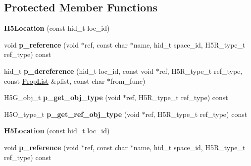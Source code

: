 \subsection*{Protected Member Functions}
\begin{DoxyCompactItemize}
\item 
\mbox{\label{class_h5_1_1_h5_location_a0ca5c720d5b48dfeb15a2aac9fe0949c}} 
{\bfseries H5\+Location} (const hid\+\_\+t loc\+\_\+id)
\item 
\mbox{\label{class_h5_1_1_h5_location_a38b69af1d6e5648568a9568c99e660a3}} 
void {\bfseries p\+\_\+reference} (void $\ast$ref, const char $\ast$name, hid\+\_\+t space\+\_\+id, H5\+R\+\_\+type\+\_\+t ref\+\_\+type) const
\item 
\mbox{\label{class_h5_1_1_h5_location_a36f569b137f8d372afe3e3f75bf24211}} 
hid\+\_\+t {\bfseries p\+\_\+dereference} (hid\+\_\+t loc\+\_\+id, const void $\ast$ref, H5\+R\+\_\+type\+\_\+t ref\+\_\+type, const \hyperlink{class_h5_1_1_prop_list}{Prop\+List} \&plist, const char $\ast$from\+\_\+func)
\item 
\mbox{\label{class_h5_1_1_h5_location_a2dd2a47996c102b2446ed4002d819059}} 
H5\+G\+\_\+obj\+\_\+t {\bfseries p\+\_\+get\+\_\+obj\+\_\+type} (void $\ast$ref, H5\+R\+\_\+type\+\_\+t ref\+\_\+type) const
\item 
\mbox{\label{class_h5_1_1_h5_location_a500db936b9aa7a88d75ed65c955822e1}} 
H5\+O\+\_\+type\+\_\+t {\bfseries p\+\_\+get\+\_\+ref\+\_\+obj\+\_\+type} (void $\ast$ref, H5\+R\+\_\+type\+\_\+t ref\+\_\+type) const
\item 
\mbox{\label{class_h5_1_1_h5_location_a0ca5c720d5b48dfeb15a2aac9fe0949c}} 
{\bfseries H5\+Location} (const hid\+\_\+t loc\+\_\+id)
\item 
\mbox{\label{class_h5_1_1_h5_location_a38b69af1d6e5648568a9568c99e660a3}} 
void {\bfseries p\+\_\+reference} (void $\ast$ref, const char $\ast$name, hid\+\_\+t space\+\_\+id, H5\+R\+\_\+type\+\_\+t ref\+\_\+type) const
\item 
\mbox{\label{class_h5_1_1_h5_location_a36f569b137f8d372afe3e3f75bf24211}} 

\end{DoxyCompactItemize}
